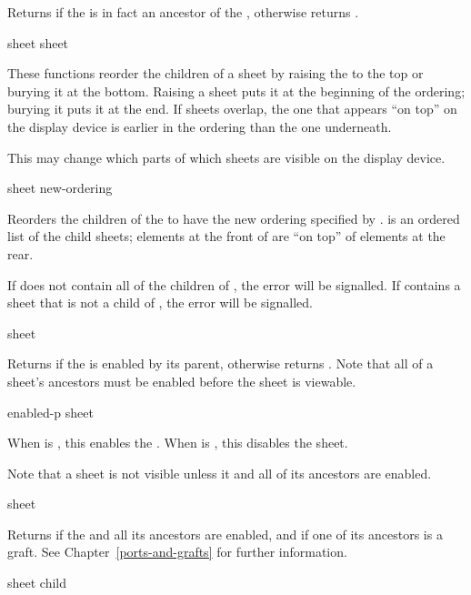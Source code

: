 Returns  if the   is in fact
an ancestor of the  , otherwise returns .

 {sheet}
  {sheet}

These functions reorder the children of a sheet by raising the 
 to the top or burying it at the bottom.  Raising a sheet puts it at
the beginning of the ordering; burying it puts it at the end.  If sheets
overlap, the one that appears ``on top'' on the display device is earlier in the
ordering than the one underneath.

This may change which parts of which sheets are visible on the display device.

 {sheet new-ordering}

Reorders the children of the   to have the new ordering
specified by .   is an ordered list of the
child sheets; elements at the front of  are ``on top'' of
elements at the rear.

If  does not contain all of the children of , the
 error will be signalled.  If
 contains a sheet that is not a child of , the
 error will be signalled.

 {sheet}

Returns  if the   is enabled by its
parent, otherwise returns .  Note that all of a sheet's ancestors
must be enabled before the sheet is viewable.

 {enabled-p sheet}

When  is , this enables the 
.  When  is , this disables the sheet.

Note that a sheet is not visible unless it and all of its ancestors are enabled.


 {sheet}

Returns  if the   and all its ancestors are
enabled, and if one of its ancestors is a graft.  See
Chapter~\ref{ports-and-grafts} for further information.

 {sheet child}

